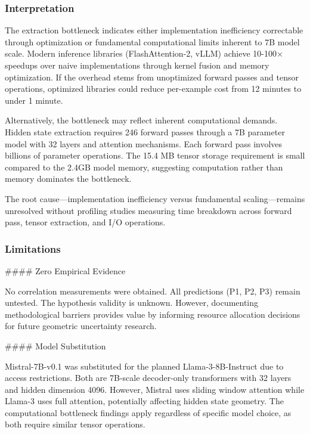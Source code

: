 
\subsubsection{Interpretation}

The extraction bottleneck indicates either implementation inefficiency correctable through optimization or fundamental computational limits inherent to 7B model scale. Modern inference libraries (FlashAttention-2, vLLM) achieve 10-100× speedups over naive implementations through kernel fusion and memory optimization. If the overhead stems from unoptimized forward passes and tensor operations, optimized libraries could reduce per-example cost from 12 minutes to under 1 minute.

Alternatively, the bottleneck may reflect inherent computational demands. Hidden state extraction requires 246 forward passes through a 7B parameter model with 32 layers and attention mechanisms. Each forward pass involves billions of parameter operations. The 15.4 MB tensor storage requirement is small compared to the 2.4GB model memory, suggesting computation rather than memory dominates the bottleneck.

The root cause—implementation inefficiency versus fundamental scaling—remains unresolved without profiling studies measuring time breakdown across forward pass, tensor extraction, and I/O operations.

\subsubsection{Limitations}

\#\#\#\# Zero Empirical Evidence

No correlation measurements were obtained. All predictions (P1, P2, P3) remain untested. The hypothesis validity is unknown. However, documenting methodological barriers provides value by informing resource allocation decisions for future geometric uncertainty research.

\#\#\#\# Model Substitution

Mistral-7B-v0.1 was substituted for the planned Llama-3-8B-Instruct due to access restrictions. Both are 7B-scale decoder-only transformers with 32 layers and hidden dimension 4096. However, Mistral uses sliding window attention while Llama-3 uses full attention, potentially affecting hidden state geometry. The computational bottleneck findings apply regardless of specific model choice, as both require similar tensor operations.

